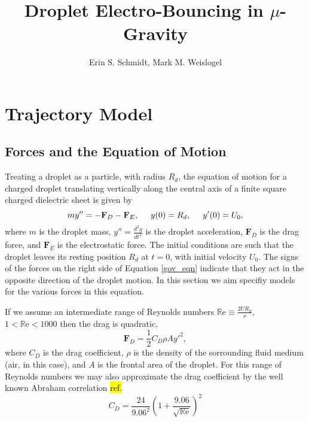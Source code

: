 \documentclass[a4paper, 12pt]{article}
\title{\textsf{\textbf{Droplet Electro-Bouncing in $\mu$-Gravity}}}
\author{Erin S. Schmidt, Mark M. Weislogel}
\date{}
\begin{document}

\doublespacing

\section{Trajectory Model}
\subsection{Forces and the Equation of Motion}
Treating a droplet as a particle, with radius $R_d$, the  equation of motion for a charged droplet translating vertically along the central axis of a finite square charged dielectric sheet is given by
\begin{equation}
m y'' = - \mathbf{F}_D - \mathbf{F}_E, \hspace{5 mm} y(0) = R_d, \hspace{5 mm} y'(0) = U_0,
\label{gov_eqn}
\end{equation}
where $m$ is the droplet mass, $y'' = \frac{d^2 y}{d t^2}$ is the droplet acceleration, $\mathbf{F}_D$ is the drag force, and $\mathbf{F}_E$ is the electrostatic force. The initial conditions are such that the droplet leaves its resting position $R_d$ at $t=0$, with initial velocity $U_0$. The signs of the forces on the right side of Equation \ref{gov_eqn} indicate that they act in the opposite direction of the droplet motion. In this section we aim specifiy models for the various forces in this equation.

If we assume an intermediate range of Reynolds numbers $\mathbb{R}\mbox{e} \equiv \frac{2UR_d}{\nu}$, $1 <\mathbb{R}\mbox{e} < 1000 $ then the drag is quadratic,
\begin{equation*}\label{drag_force}
\mathbf{F}_D = \frac{1}{2}C_D \rho A {y'}^2,
\end{equation*}
where $C_D$ is the drag coefficient, $\rho$ is the density of the sorrounding fluid medium (air, in this case), and $A$ is the frontal area of the droplet. For this range of Reynolds numbers we may also approximate the drag coefficient by the well known Abraham correlation \hl{ref.}
\[C_D = \frac{24}{9.06^2} \left( 1 + \frac{9.06}{\sqrt{\mathbb{R}\mbox{e}}} \right)^2\]
\end{document}
